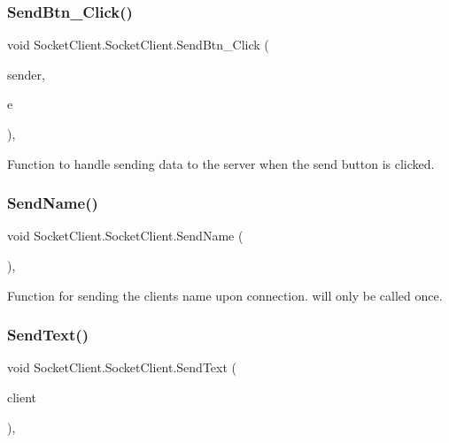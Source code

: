 \subsubsection{\texorpdfstring{Send\+Btn\+\_\+\+Click()}{SendBtn\_Click()}}
{\footnotesize\ttfamily void Socket\+Client.\+Socket\+Client.\+Send\+Btn\+\_\+\+Click (\begin{DoxyParamCaption}\item[{object}]{sender,  }\item[{Event\+Args}]{e }\end{DoxyParamCaption})\hspace{0.3cm}{\ttfamily [inline]}, {\ttfamily [private]}}

Function to handle sending data to the server when the send button is clicked. \mbox{\label{class_socket_client_1_1_socket_client_aa5bdeccde8564ade04ece861218ba7f3}} 
\subsubsection{\texorpdfstring{Send\+Name()}{SendName()}}
{\footnotesize\ttfamily void Socket\+Client.\+Socket\+Client.\+Send\+Name (\begin{DoxyParamCaption}{ }\end{DoxyParamCaption})\hspace{0.3cm}{\ttfamily [inline]}, {\ttfamily [private]}}

Function for sending the clients name upon connection. will only be called once. \mbox{\label{class_socket_client_1_1_socket_client_a0ffad9543c6accf3fa6a6d957b34feb9}} 
\subsubsection{\texorpdfstring{Send\+Text()}{SendText()}}
{\footnotesize\ttfamily void Socket\+Client.\+Socket\+Client.\+Send\+Text (\begin{DoxyParamCaption}\item[{\hyperlink{class_socket_client_1_1_client}{Client}}]{client }\end{DoxyParamCaption})\hspace{0.3cm}{\ttfamily [inline]}, {\ttfamily [private]}}

